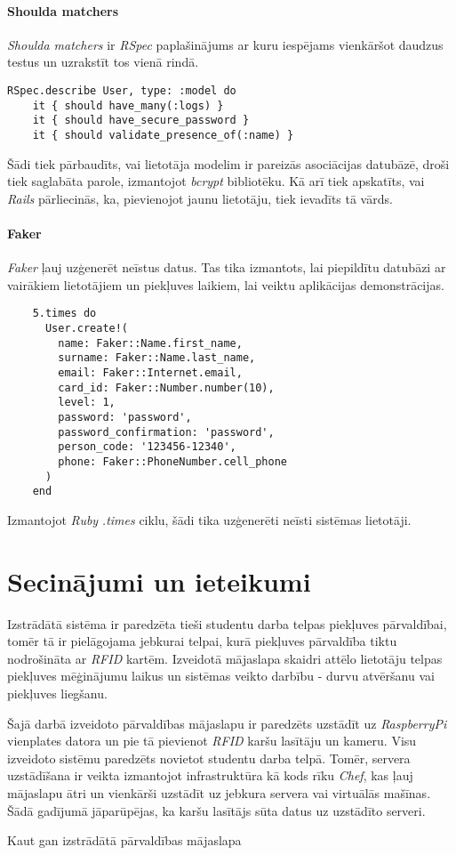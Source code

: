 \subsubsection{Shoulda matchers}
\textit{Shoulda matchers} ir \textit{RSpec} paplašinājums ar kuru iespējams vienkāršot daudzus testus un uzrakstīt tos vienā rindā.
\begin{lstlisting}
RSpec.describe User, type: :model do
	it { should have_many(:logs) }
	it { should have_secure_password }
	it { should validate_presence_of(:name) }
\end{lstlisting}
Šādi tiek pārbaudīts, vai lietotāja modelim ir pareizās asociācijas datubāzē, droši tiek saglabāta parole, izmantojot \textit{bcrypt} bibliotēku. Kā arī tiek apskatīts, vai \textit{Rails} pārliecinās, ka, pievienojot jaunu lietotāju, tiek ievadīts tā vārds.

\subsubsection{Faker}
\textit{Faker} ļauj uzģenerēt neīstus datus. Tas tika izmantots, lai piepildītu datubāzi ar vairākiem lietotājiem un piekļuves laikiem, lai veiktu aplikācijas demonstrācijas.
\begin{lstlisting}
	5.times do
	  User.create!(
	    name: Faker::Name.first_name,
	    surname: Faker::Name.last_name,
	    email: Faker::Internet.email,
	    card_id: Faker::Number.number(10),
	    level: 1,
	    password: 'password',
	    password_confirmation: 'password',
	    person_code: '123456-12340',
	    phone: Faker::PhoneNumber.cell_phone
	  )
	end
\end{lstlisting}
Izmantojot \textit{Ruby} \textit{.times} ciklu, šādi tika uzģenerēti neīsti sistēmas lietotāji.

\chapter{Secinājumi un ieteikumi}
Izstrādātā sistēma ir paredzēta tieši studentu darba telpas piekļuves pārvaldībai,
tomēr tā ir pielāgojama jebkurai telpai, kurā piekļuves pārvaldība tiktu nodrošināta
ar \textit{RFID} kartēm.
Izveidotā mājaslapa skaidri attēlo lietotāju telpas piekļuves mēģinājumu laikus
un sistēmas veikto darbību - durvu atvēršanu vai piekļuves liegšanu.

Šajā darbā izveidoto pārvaldības mājaslapu ir paredzēts uzstādīt uz
\textit{RaspberryPi} vienplates datora un pie tā pievienot \textit{RFID}
karšu lasītāju un kameru. Visu izveidoto sistēmu paredzēts novietot studentu darba telpā.
Tomēr, servera uzstādīšana ir veikta izmantojot infrastruktūra kā kods rīku \textit{Chef}, kas ļauj mājaslapu ātri un vienkārši uzstādīt uz jebkura servera vai virtuālās mašīnas. Šādā gadījumā jāparūpējas, ka karšu lasītājs sūta datus uz uzstādīto serveri.


Kaut gan izstrādātā pārvaldības mājaslapa